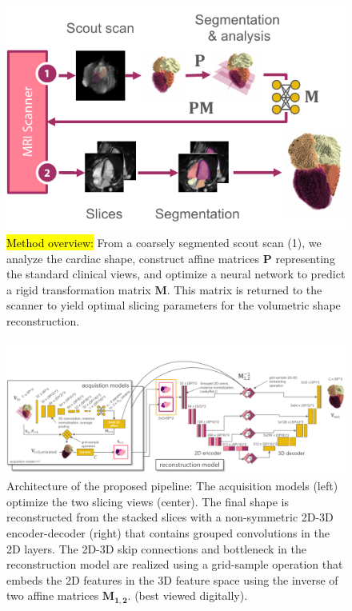     \begin{figure}
         \includegraphics[width=.45\linewidth]{figures/experimental_setup.pdf}
      \caption{
        \hl{Method overview:} %
        From a coarsely segmented scout scan (1), we analyze the cardiac shape, construct affine matrices $\mathbf{P}$ representing the standard clinical views, and optimize a neural network to predict a rigid transformation matrix $\mathbf{M}$. This matrix is returned to the scanner to yield optimal slicing parameters for the volumetric shape reconstruction. }
      \label{fig:method_overview}
    \end{figure}

    \begin{figure}[H]
        \includegraphics[width=0.98\linewidth]{figures/architecture.pdf}
        \caption{Architecture of the proposed pipeline: The acquisition models (left) optimize the two slicing views (center). The final shape is reconstructed from the stacked slices with a non-symmetric 2D-3D encoder-decoder (right) that contains grouped convolutions in the 2D layers. The 2D-3D skip connections and bottleneck in the reconstruction model are realized using a grid-sample operation that embeds the 2D features in the 3D feature space using the inverse of two affine matrices $\mathbf{M_{1,2}}$. (best viewed digitally).}
    \label{fig:architecture}
    \end{figure}

